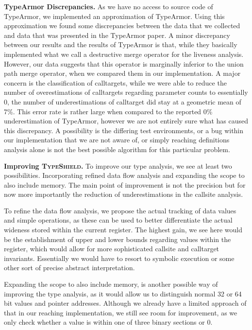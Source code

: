 \textbf{TypeArmor Discrepancies.}
\label{section:discrep}
As we have no access to source code of TypeArmor, we implemented an approximation
of TypeArmor. Using this approximation we found some discrepancies between the data that we collected
and data that was presented in the TypeArmor paper.
A minor discrepancy between our results and the results of TypeArmor is that, while they basically implemented
what we call a destructive merge operator for the liveness analysis. However, our data suggests that this
operator is marginally inferior to the union path merge operator, when we compared them in our implementation.
A major concern is the classification of calltargets, while we were able to reduce the number of overestimations
of calltargets regarding parameter counts to essentially 0, the number of underestimations of calltarget did
stay at a geometric mean of 7\%. This error rate is rather large when compared to the reported 0\% underestimation
of TypeArmor, however we are not entirely sure what has caused this discrepancy. A possibility is the differing
test environments, or a bug within our implementation that we are not aware of, or simply reaching definitions
analysis alone is not the best possible algorithm for this particular problem.

\textbf{Improving \textsc{TypeShield}.}
\label{section:venuesimp}
To improve our type analysis, we see at least two possibilities. Incorporating refined data flow analysis and 
expanding the scope to also include memory. The main point of improvement is not the precision but for now 
more importantly the reduction of underestimations in the callsite analysis.

To refine the data flow analysis, we propose the actual tracking of data values and simple operations, as these
can be used to better differentiate the actual wideness stored within the current register. The highest gain, 
we see here would be the establishment of upper and lower bounds regarding values within the register, which 
would allow for more sophisticated callsite and calltarget invariants. Essentially we would have to resort 
to symbolic execution or some other sort of precise abstract interpretation.

Expanding the scope to also include memory, is another possible way of improving the type analysis, as it 
would allow us to distinguish normal 32 or 64 bit values and pointer addresses. Although we already have a 
limited approach of that in our reaching implementation, we still see room for improvement, as we only check
whether a value is within one of three binary sections or 0.

